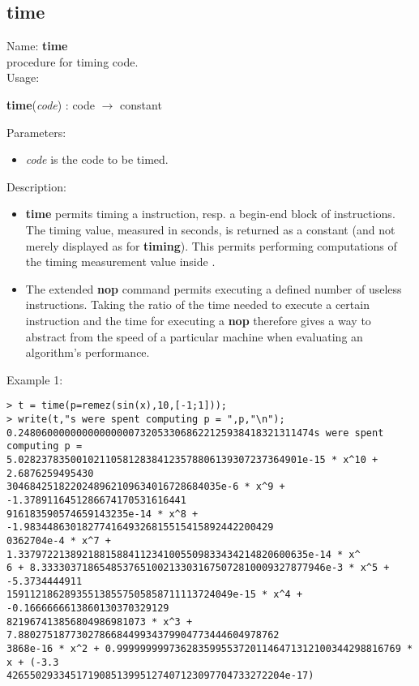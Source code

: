 \subsection{time}
\label{labtime}
\noindent Name: \textbf{time}\\
\phantom{aaa}procedure for timing \sollya code.\\[0.2cm]
\noindent Usage: 
\begin{center}
\textbf{time}(\emph{code}) : \textsf{code} $\rightarrow$ \textsf{constant}\\
\end{center}
Parameters: 
\begin{itemize}
\item \emph{code} is the code to be timed.
\end{itemize}
\noindent Description: \begin{itemize}

\item \textbf{time} permits timing a \sollya instruction, resp. a begin-end block
   of \sollya instructions. The timing value, measured in seconds, is returned
   as a \sollya constant (and not merely displayed as for \textbf{timing}). This 
   permits performing computations of the timing measurement value inside \sollya.

\item The extended \textbf{nop} command permits executing a defined number of
   useless instructions. Taking the ratio of the time needed to execute a
   certain \sollya instruction and the time for executing a \textbf{nop}
   therefore gives a way to abstract from the speed of a particular 
   machine when evaluating an algorithm's performance.
\end{itemize}
\noindent Example 1: 
\begin{center}\begin{minipage}{15cm}\begin{Verbatim}[frame=single]
> t = time(p=remez(sin(x),10,[-1;1]));
> write(t,"s were spent computing p = ",p,"\n");
0.248060000000000000007320533068622125938418321311474s were spent computing p = 
5.0282378350010211058128384123578806139307237364901e-15 * x^10 + 2.6876259495430
3046842518220248962109634016728684035e-6 * x^9 + -1.3789116451286674170531616441
916183590574659143235e-14 * x^8 + -1.9834486301827741649326815515415892442200429
0362704e-4 * x^7 + 1.33797221389218815884112341005509833434214820600635e-14 * x^
6 + 8.3333037186548537651002133031675072810009327877946e-3 * x^5 + -5.3734444911
159112186289355138557505858711113724049e-15 * x^4 + -0.1666666613860130370329129
821967413856804986981073 * x^3 + 7.880275187730278668449934379904773444604978762
3868e-16 * x^2 + 0.9999999997362835995537201146471312100344298816769 * x + (-3.3
426550293345171908513995127407123097704733272204e-17)
\end{Verbatim}
\end{minipage}\end{center}
